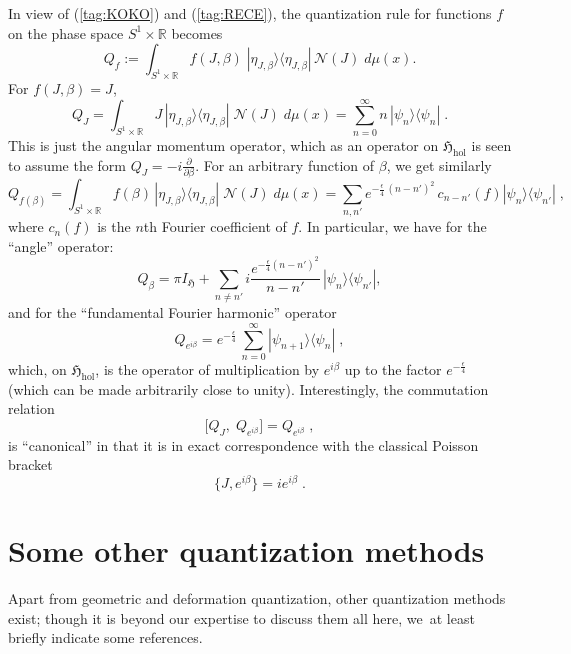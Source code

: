 \documentclass[12pt]{amsart}
\numberwithin{equation}{section}
\theoremstyle{remark}
\newcommand\HH{\mathfrak H}
\begin{document}
In view of (\ref{tag:KOKO}) and (\ref{tag:RECE}), the quantization rule for
functions $f$ on the phase space $S^1\times \mathbb R$ becomes
\begin{equation}
Q_f := \int_{S^1\times \mathbb R} f(J, \beta )\; | \eta_{J, \beta}\rangle
\langle \eta_{J, \beta}| \, \mathcal{N}(J)\; d\mu(x) .  \label{tag: oper}
\end{equation}
For $f(J, \beta ) = J$,
\begin{equation}
  Q_J = \int_{S^1\times \mathbb R} J\, | \eta_{J,\beta} \rangle
   \langle \eta_{J,\beta} |\;\mathcal{N}(J)\;d\mu (x)
  = \sum_{n=0}^\infty n\, | \psi_n\rangle \langle \psi_n|\; .
\label{tag:Jsym}
\end{equation}
This is just the angular momentum operator, which as an operator on
$\HH_\text{hol}$ is seen to assume the form
$Q_J = -i\frac{\partial}{\partial \beta}$.
For an arbitrary function of $\beta$, we get similarly
\begin{equation}
 Q_{f(\beta)} = \int_{S^1\times \mathbb R}  f(\beta) \,  |\eta_{J,\beta}\rangle
  \langle \eta_{J,\beta} |\; \mathcal{N}(J)\; d\mu(x)  = \sum_{n,n'}
  e^{-\frac{\epsilon}{4}\,(n-n')^2} \,c_{n-n'}(f)| \psi_n\rangle
 \langle \psi_{n'} |\; ,
\label{tag:f(beta)}
\end{equation}
where $c_{n}(f)$ is the $n$th Fourier coefficient of $f$. In particular, we
have for the ``angle'' operator:
\begin{equation}
\label{tag:opangle}
 Q_{\beta} = \pi I_{\HH} +  \sum_{n\neq n'} i
 \frac{e^{-\frac{\epsilon}{4}(n-n')^2}}{n-n'}\, | \psi_n \rangle
 \langle \psi_{n'} |,
\end{equation}
and for the ``fundamental Fourier harmonic'' operator
\begin{equation}
\label{tag:opfourier}
Q_{e^{i\beta}} =  e^{-\frac{\epsilon}{4}}\, \sum_{n=0}^\infty
 | \psi_{n + 1}\rangle \langle \psi_n |\; ,
\end{equation}
which, on $\HH_\text{hol}$, is the operator of multiplication by  $e^{i\beta}$
up to the factor $e^{-\frac{\epsilon}{4}}$ (which can be made arbitrarily close
to unity). Interestingly, the commutation relation
\begin{equation}
 \lbrack Q_J, \;Q_{e^{i\beta}} \rbrack = Q_{e^{i\beta}}\;,
\label{tag:cylccr}
\end{equation}
is ``canonical'' in that it is in exact correspondence with the classical
Poisson bracket
$$\{ J, e^{i\beta}\} = i e^{i\beta}\; . $$



\section{Some other quantization methods} \label{sec6}
Apart from geometric and deformation quantization, other quantization methods
exist; though it is beyond our expertise to discuss them all here, we~at least
briefly indicate some references.
\end{document}
